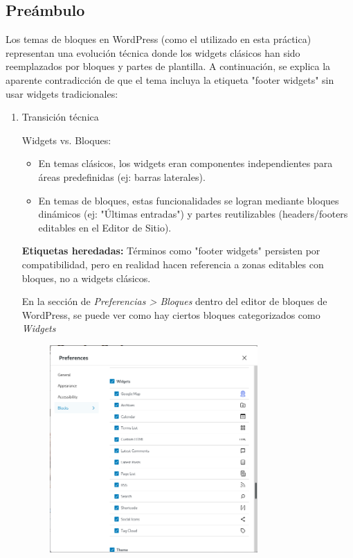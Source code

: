 \documentclass[a4paper]{article}
\begin{document}
\subsection{Preámbulo}

Los temas de bloques en WordPress (como el utilizado en esta práctica) representan una evolución técnica donde los widgets clásicos han sido reemplazados por bloques y partes de plantilla. A continuación, se explica la aparente contradicción de que el tema incluya la etiqueta "footer widgets" sin usar widgets tradicionales:

\begin{enumerate}
    \item Transición técnica

        Widgets vs. Bloques:

        \begin{itemize}
            \item En temas clásicos, los widgets eran componentes independientes para áreas predefinidas (ej: barras laterales).

            \item En temas de bloques, estas funcionalidades se logran mediante bloques dinámicos (ej: "Últimas entradas") y partes reutilizables (headers/footers editables en el Editor de Sitio).
        \end{itemize}

        \textbf{Etiquetas heredadas:}
        Términos como "footer widgets" persisten por compatibilidad, pero en realidad hacen referencia a zonas editables con bloques, no a widgets clásicos.

        En la sección de \textit{Preferencias > Bloques} dentro del editor de bloques de WordPress, se puede ver como hay ciertos bloques categorizados como \textit{Widgets}
        \begin{figure}[H]
            \centering
            \includegraphics[width=0.75\textwidth]{images/widget-block-confusion.png}
        \end{figure}


\end{enumerate}
\end{document}
